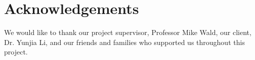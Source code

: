 \chapter*{Acknowledgements}

We would like to thank our project supervisor, Professor Mike Wald, our client, Dr. Yunjia Li, and our friends and families who supported us throughout this project.